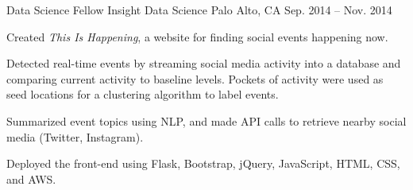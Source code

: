 \begin{cventries}
  \cventry
    {Data Science Fellow} %
    {Insight Data Science} %
    {Palo Alto, CA} %
    {Sep. 2014 -- Nov. 2014} %
    {
      \begin{cvitems} %
        \item {Created \textit{This Is Happening}, a website for finding social events happening now.}
        \item {Detected real-time events by streaming social media activity into a database and comparing current activity to baseline levels. Pockets of activity were used as seed locations for a clustering algorithm to label events.}
        \item {Summarized event topics using NLP, and made API calls to retrieve nearby social media (Twitter, Instagram).}
        \item {Deployed the front-end using Flask, Bootstrap, jQuery, JavaScript, HTML, CSS, and AWS.}
      \end{cvitems}
    }



\end{cventries}
